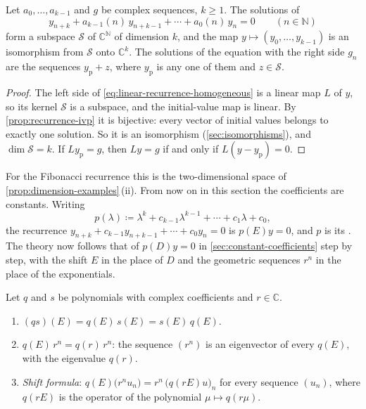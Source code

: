 \begin{theorem}
\label{thm:recurrence-solution-space}
Let $a_0,\ldots,a_{k-1}$ and $g$ be complex sequences, $k\ge1$. The solutions of
\begin{equation}
y_{n+k}+a_{k-1}(n)\,y_{n+k-1}+\cdots+a_0(n)\,y_n=0\qquad(n\in\mathbb N)
\label{eq:linear-recurrence-homogeneous}
\end{equation}
form a subspace $\mathcal S$ of $\mathbb C^{\mathbb N}$ of dimension $k$, and the map $y\mapsto(y_0,\ldots,y_{k-1})$ is an isomorphism from $\mathcal S$ onto $\mathbb C^k$. The solutions of the equation with the right side $g_n$ are the sequences $y_{\mathrm p}+z$, where $y_{\mathrm p}$ is any one of them and $z\in\mathcal S$.
\end{theorem}

\begin{proof}
The left side of \eqref{eq:linear-recurrence-homogeneous} is a linear map $L$ of $y$, so its kernel $\mathcal S$ is a subspace, and the initial-value map is linear. By \cref{prop:recurrence-ivp} it is bijective: every vector of initial values belongs to exactly one solution. So it is an isomorphism (\cref{sec:isomorphisms}), and $\dim\mathcal S=k$. If $Ly_{\mathrm p}=g$, then $Ly=g$ if and only if $L(y-y_{\mathrm p})=0$.
\end{proof}

For the Fibonacci recurrence this is the two-dimensional space of \cref{prop:dimension-examples}\,(ii). From now on in this section the coefficients are constants. Writing
\begin{equation}
p(\lambda)\coloneqq\lambda^k+c_{k-1}\lambda^{k-1}+\cdots+c_1\lambda+c_0 ,
\label{eq:recurrence-char}
\end{equation}
the recurrence $y_{n+k}+c_{k-1}y_{n+k-1}+\cdots+c_0y_n=0$ is $p(E)y=0$, and $p$ is its . The theory now follows that of $p(D)y=0$ in \cref{sec:constant-coefficients} step by step, with the shift $E$ in the place of $D$ and the geometric sequences $r^n$ in the place of the exponentials.

\begin{lemma}[Polynomials in $E$]
\label{lem:polynomials-in-e}
Let $q$ and $s$ be polynomials with complex coefficients and $r\in\mathbb C$.
\begin{enumerate}
\item $(qs)(E)=q(E)\,s(E)=s(E)\,q(E)$.
\item $q(E)\,r^n=q(r)\,r^n$: the sequence $(r^n)$ is an eigenvector of every $q(E)$, with the eigenvalue $q(r)$.
\item \emph{Shift formula}: $q(E)\bigl(r^nu_n\bigr)=r^n\,\bigl(q(rE)u\bigr)_n$ for every sequence $(u_n)$, where $q(rE)$ is the operator of the polynomial $\mu\mapsto q(r\mu)$.
\end{enumerate}
\end{lemma}

